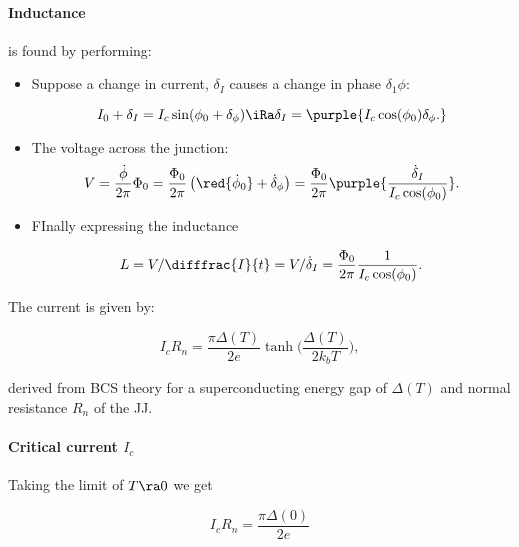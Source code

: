   \paragraph{Inductance} is found by performing:
  
  \begin{itemize}
  \item Suppose a change in current, $ \delta_I $ causes a change in phase $ \delta_1\phi $:
  	
  	\begin{equation}\label{key}
          I_0 + \delta_I = I_c\sin(\phi_0+\delta_\phi) \iRa \delta_I = \purple{I_c\cos(\phi_0)\delta_\phi.}
  	\end{equation}
      \item The voltage across the junction:
  	\begin{equation}\label{key}
          V = \frac{\dot{\phi}}{2\pi}\Phi_0 = \frac{\Phi_0}{2\pi}\left(\red{\dot{\phi}_0} + \dot{\delta}_\phi\right) =  \frac{\Phi_0}{2\pi}\purple{\frac{\dot{\delta}_I}{I_c\cos(\phi_0)}}.
  	\end{equation}
  	
      \item FInally expressing the inductance
  	
  	\begin{equation}\label{key}
          L = V/\difffrac{I}{t} = V/\dot{\delta}_I = \frac{\Phi_0}{2\pi}\frac{1}{I_c\cos(\phi_0)}.
  	\end{equation}
      \end{itemize}
   
   
      \noindent The current is given by:
   
   \begin{equation}\label{key}
     I_cR_n = \frac{\pi\Delta(T)}{2e}\tanh\big(\frac{\Delta(T)}{2k_bT}\big),
   \end{equation}
   
   \noindent derived  from BCS theory for  a superconducting energy  gap of $ \Delta(T)  $ and
   normal resistance $ R_n $ of the JJ.
   
   {
     \paragraph{Critical current $ I_c $}
     Taking the limit of $ T\ra0 $ we get
   	
   	\begin{equation}\label{app:criticalCurrent}
          I_cR_n = \frac{\pi\Delta(0)}{2e}
   	\end{equation}
      }
   
